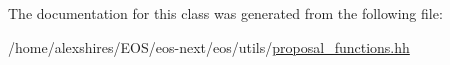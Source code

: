 The documentation for this class was generated from the following file:\begin{DoxyCompactItemize}
\item 
/home/alexshires/EOS/eos-\/next/eos/utils/\hyperlink{proposal__functions_8hh}{proposal\_\-functions.hh}\end{DoxyCompactItemize}
